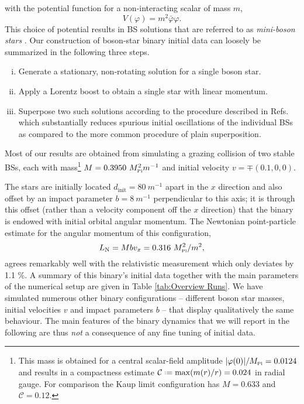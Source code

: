 \documentclass[11pt]{report}  %
\newcommand{\mpl}{M_{\mbox{\tiny Pl}}}
\newcommand*{\defeq}{\mathrel{\vcenter{\baselineskip0.5ex \lineskiplimit0pt
                     \hbox{\scriptsize.}\hbox{\scriptsize.}}}%
                     =}
\begin{document}
with the potential function for a non-interacting scalar
of mass $m$,
\begin{equation}
    V(\varphi) = m^2 \bar{\varphi} \varphi.
\end{equation}
This choice of potential results in BS solutions that are referred to as {\it mini-boson stars}
\cite{ Kaup:1968zz,Gleiser:1988rq,Jetzer:1988vr}. 
Our construction of boson-star binary initial data can loosely
be summarized in the following three steps.
\begin{enumerate}[(i)]
    \item Generate a stationary, non-rotating solution for a single boson star.
    \item Apply a Lorentz boost to obtain a single star with linear momentum.
    \item Superpose two such solutions
    according to the procedure described in
    Refs.~\cite{Helfer:2018vtq,Helfer:2021brt} which
    substantially reduces spurious initial oscillations of the
    individual BSs as compared to the more common procedure
    of plain superposition.
\end{enumerate}

Most of our results are obtained from
simulating a grazing collision of two stable BSs, each with mass\footnote{This mass is obtained for a central scalar-field amplitude $|\varphi(0)|/\mpl =0.0124$ and results in a compactness estimate
$\mathcal{C} \defeq \max (m(r)/r) = 0.024$ in radial gauge.
For comparison the Kaup limit configuration has
$M=0.633$ and $\mathcal{C} = 0.12$.}  $M = 0.3950
~\mpl^2 m^{-1}$ and
initial velocity $v = \mp(0.1,0,0)$.



%
The stars are initially located $d_{\text{init}} = 80~m^{-1}$
apart in the $x$ direction and also offset by an impact parameter
$b=8~m^{-1}$ perpendicular to this axis; it is through this offset
(rather than a velocity component off the $x$ direction) that
the binary is endowed with initial orbital angular momentum.
The Newtonian point-particle estimate for the angular momentum
of this configuration,
%
\begin{equation}
    L_{ \rm N} =  M b v_x = 0.316~\mpl^2/m^2,
\end{equation}
%
agrees remarkably well with the relativistic measurement which only deviates by 1.1 \%.
A summary of this binary's initial data together with the main parameters of the numerical setup are given in Table \ref{tab:Overview Runs}. We have simulated numerous other
binary configurations -- different boson star masses, initial velocities $v$ and impact parameters $b$ -- that display qualitatively
the same behaviour. The main features of the binary dynamics
that we will report in the following are thus {\it not} a
consequence of any fine tuning of initial data.
\end{document}
